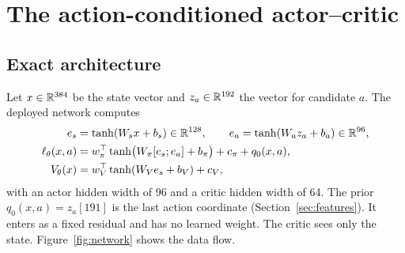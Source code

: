 \section{The action-conditioned actor--critic}
\label{sec:network}

\historyscope

\subsection{Exact architecture}
Let $x\in\mathbb{R}^{384}$ be the state vector and $z_a\in\mathbb{R}^{192}$ the vector for
candidate $a$. The deployed  network computes
\begin{align}
  e_s&=\tanh(W_sx+b_s)\in\mathbb{R}^{128},\qquad
  e_a=\tanh(W_az_a+b_a)\in\mathbb{R}^{96},\\
  \ell_\theta(x,a)&=w_\pi^\top\tanh\!\big(W_\pi[e_s;e_a]+b_\pi\big)+c_\pi+q_0(x,a),
    \label{eq:logit}\\
  V_\theta(x)&=w_V^\top\tanh(W_Ve_s+b_V)+c_V,
\end{align}
with an actor hidden width of 96 and a critic hidden width of 64. The prior
$q_0(x,a)=z_a[191]$ is the last action coordinate (Section~\ref{sec:features}).
It enters as a fixed residual and has no learned weight. The critic sees only
the state. Figure~\ref{fig:network} shows the data flow.

